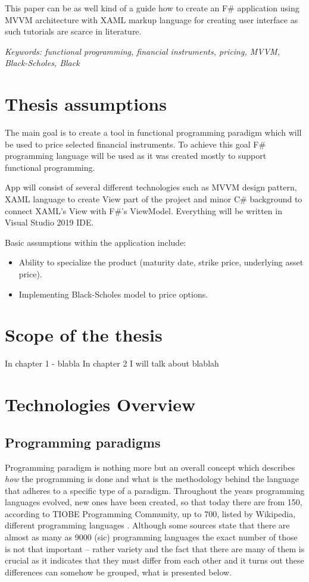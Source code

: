     This paper can be as well kind of a guide how to create an F\# application using MVVM architecture with XAML markup language for creating user interface as such tutorials are scarce in literature.
    
    \emph{Keywords: functional programming, financial instruments, pricing, MVVM, Black-Scholes, Black}

\section{Thesis assumptions}
    The main goal is to create a tool in functional programming paradigm which will be used to price selected financial instruments. To achieve this goal F\# programming language will be used as it was created mostly to support functional programming.
    
    App will consist of several different technologies such as MVVM design pattern, XAML language to create View part of the project and minor C\# background to connect XAML's View with F\#'s ViewModel. Everything will be written in Visual Studio 2019 IDE.
    
    Basic assumptions within the application include:
    \begin{itemize}
    \item Ability to specialize the product (maturity date, strike price, underlying asset price).
    \item Implementing Black-Scholes model to price options.
    \end{itemize}

\section{Scope of the thesis}
    In chapter 1 - blabla
    In chapter 2 I will talk about blablah

\section{Technologies Overview}
\subsection{Programming paradigms}
    Programming paradigm is nothing more but an overall concept which describes \textit{how} the programming is done and what is the methodology behind the language that adheres to a specific type of a paradigm. Throughout the years programming languages evolved, new ones have been created, so that today there are from 150, according to TIOBE Programming Community, up to 700, listed by Wikipedia, different programming languages \cite{numberOfProgrammingLanguages}. Although some sources \cite{numberOfProgrammingLanguages_hopl_info} state that there are almost as many as 9000 (sic) programming languages the exact number of those is not that important -- rather variety and the fact that there are many of them is crucial as it indicates that they must differ from each other and it turns out these differences can somehow be grouped, what is presented below.
    
